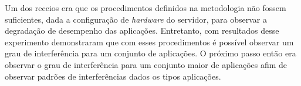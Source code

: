 Um dos receios era que os procedimentos definidos na metodologia não fossem suficientes, dada a configuração de \textit{hardware} do servidor, para observar a degradação de desempenho das aplicações. Entretanto, com resultados desse experimento demonstraram que com esses procedimentos é possível observar um grau de interferência para um conjunto de aplicações. O próximo passo então era observar o grau de interferência para um conjunto maior de aplicações afim de observar padrões de interferências dados os tipos aplicações. %

  

